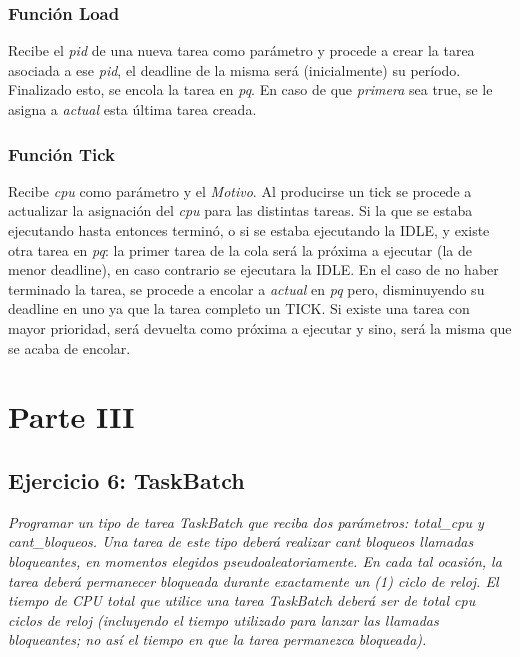 \documentclass[a4paper]{article}
\begin{document}
\subsubsection*{Funci\'on Load}

Recibe el \emph{pid} de una nueva tarea como par\'ametro y procede a crear la tarea asociada a ese \emph{pid}, el deadline de la misma ser\'a (inicialmente) su per\'iodo. Finalizado esto, se encola la tarea en \emph{pq}. En caso de que \emph{primera} sea true, se le asigna a \emph{actual} esta última tarea creada.

\subsubsection*{Funci\'on Tick}	

Recibe \emph{cpu} como par\'ametro y el \emph{Motivo}. Al producirse un tick se procede a actualizar la asignación del \emph{cpu} para las distintas tareas.  Si la que se estaba ejecutando hasta entonces terminó, o si se estaba ejecutando la IDLE, y existe otra tarea en \emph{pq}: la primer tarea de la cola será la próxima a ejecutar (la de menor deadline), en caso contrario se ejecutara la IDLE. En el caso de no haber terminado la tarea, se procede a encolar a \emph{actual} en \emph{pq} pero, disminuyendo su deadline en uno ya que la tarea completo un TICK. Si existe una tarea con mayor prioridad, ser\'a devuelta como próxima a ejecutar y sino, ser\'a la misma que se acaba de encolar.  




\newpage
\section{Parte III}


 \subsection{Ejercicio 6: TaskBatch}
\textit{Programar un tipo de tarea TaskBatch que reciba dos par\'ametros: total_cpu y cant_bloqueos. Una tarea de este tipo deber\'a realizar cant bloqueos llamadas bloqueantes, en momentos elegidos pseudoaleatoriamente. En cada tal ocasi\'on, la tarea deber\'a permanecer bloqueada durante exactamente un (1) ciclo de reloj. El tiempo de CPU total que utilice una tarea TaskBatch deber\'a ser de total cpu ciclos de reloj (incluyendo el tiempo utilizado para lanzar las llamadas bloqueantes; no as\'i el tiempo en que la tarea permanezca bloqueada).}\\
\end{document}
